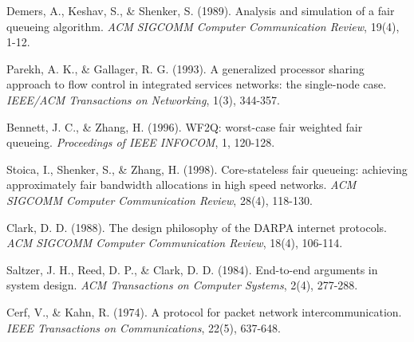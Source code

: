 \documentclass[12pt,a4paper]{article}
\begin{document}
\begin{thebibliography}{99}
Demers, A., Keshav, S., \& Shenker, S. (1989). Analysis and simulation of a fair queueing algorithm. \textit{ACM SIGCOMM Computer Communication Review}, 19(4), 1-12.

Parekh, A. K., \& Gallager, R. G. (1993). A generalized processor sharing approach to flow control in integrated services networks: the single-node case. \textit{IEEE/ACM Transactions on Networking}, 1(3), 344-357.

Bennett, J. C., \& Zhang, H. (1996). WF2Q: worst-case fair weighted fair queueing. \textit{Proceedings of IEEE INFOCOM}, 1, 120-128.

Stoica, I., Shenker, S., \& Zhang, H. (1998). Core-stateless fair queueing: achieving approximately fair bandwidth allocations in high speed networks. \textit{ACM SIGCOMM Computer Communication Review}, 28(4), 118-130.

Clark, D. D. (1988). The design philosophy of the DARPA internet protocols. \textit{ACM SIGCOMM Computer Communication Review}, 18(4), 106-114.

Saltzer, J. H., Reed, D. P., \& Clark, D. D. (1984). End-to-end arguments in system design. \textit{ACM Transactions on Computer Systems}, 2(4), 277-288.

Cerf, V., \& Kahn, R. (1974). A protocol for packet network intercommunication. \textit{IEEE Transactions on Communications}, 22(5), 637-648.

\end{thebibliography}
\end{document}

